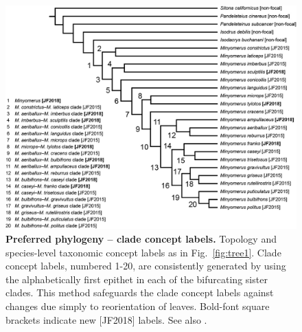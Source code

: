 \documentclass[fleqn,10pt,lineno]{wlpeerj} %
\begin{document}
\begin{figure}[h]
	\centering
	\begin{sideways}
		\includegraphics[height=0.75\textwidth]{tree2.jpg}
	\end{sideways}
	\caption{\textbf{Preferred phylogeny -- clade concept labels.} Topology and species-level taxonomic concept labels as in Fig.~\ref{fig:tree1}. Clade concept labels, numbered 1-20, are consistently generated by using the alphabetically first epithet in each of the bifurcating sister clades. This method safeguards the clade concept labels against changes due simply to reorientation of leaves. Bold-font square brackets indicate new [JF2018] labels. See also \textbf{}.}
	\label{fig:tree2}
\end{figure}
\end{document}

